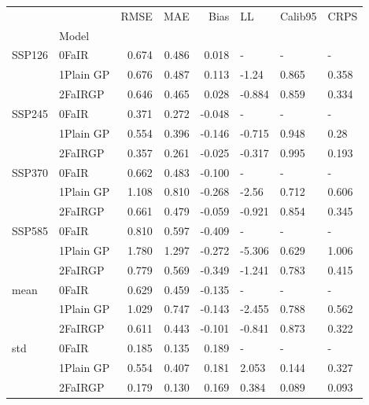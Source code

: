 \begin{tabular}{llrrrlll}
\toprule
    &         &   RMSE &    MAE &   Bias &     LL & Calib95 &   CRPS \\
{} & Model &        &        &        &        &         &        \\
\midrule
SSP126 & 0FaIR &  0.674 &  0.486 &  0.018 &      - &       - &      - \\
    & 1Plain GP &  0.676 &  0.487 &  0.113 &  -1.24 &   0.865 &  0.358 \\
    & 2FaIRGP &  0.646 &  0.465 &  0.028 & -0.884 &   0.859 &  0.334 \\
SSP245 & 0FaIR &  0.371 &  0.272 & -0.048 &      - &       - &      - \\
    & 1Plain GP &  0.554 &  0.396 & -0.146 & -0.715 &   0.948 &   0.28 \\
    & 2FaIRGP &  0.357 &  0.261 & -0.025 & -0.317 &   0.995 &  0.193 \\
SSP370 & 0FaIR &  0.662 &  0.483 & -0.100 &      - &       - &      - \\
    & 1Plain GP &  1.108 &  0.810 & -0.268 &  -2.56 &   0.712 &  0.606 \\
    & 2FaIRGP &  0.661 &  0.479 & -0.059 & -0.921 &   0.854 &  0.345 \\
SSP585 & 0FaIR &  0.810 &  0.597 & -0.409 &      - &       - &      - \\
    & 1Plain GP &  1.780 &  1.297 & -0.272 & -5.306 &   0.629 &  1.006 \\
    & 2FaIRGP &  0.779 &  0.569 & -0.349 & -1.241 &   0.783 &  0.415 \\
mean & 0FaIR &  0.629 &  0.459 & -0.135 &      - &       - &      - \\
    & 1Plain GP &  1.029 &  0.747 & -0.143 & -2.455 &   0.788 &  0.562 \\
    & 2FaIRGP &  0.611 &  0.443 & -0.101 & -0.841 &   0.873 &  0.322 \\
std & 0FaIR &  0.185 &  0.135 &  0.189 &      - &       - &      - \\
    & 1Plain GP &  0.554 &  0.407 &  0.181 &  2.053 &   0.144 &  0.327 \\
    & 2FaIRGP &  0.179 &  0.130 &  0.169 &  0.384 &   0.089 &  0.093 \\
\bottomrule
\end{tabular}
